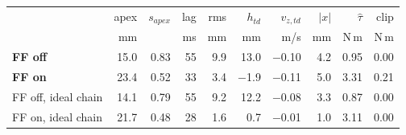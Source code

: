 \begin{tabular}{lrrrrrrrrr}
\toprule
 & apex & $s_{apex}$ & lag & rms & $h_{td}$ & $v_{z,td}$ & $|x|$ & $\hat\tau$ & clip \\
 & mm & & ms & mm & mm & m/s & mm & N\,m & N\,m \\
\midrule
\textbf{FF off} & 15.0 & 0.83 & 55 & 9.9 & 13.0 & $-$0.10 & 4.2 & 0.95 & 0.00 \\
\textbf{FF on} & 23.4 & 0.52 & 33 & 3.4 & $-$1.9 & $-$0.11 & 5.0 & 3.31 & 0.21 \\
\midrule
FF off, ideal chain & 14.1 & 0.79 & 55 & 9.2 & 12.2 & $-$0.08 & 3.3 & 0.87 & 0.00 \\
FF on, ideal chain & 21.7 & 0.48 & 28 & 1.6 & 0.7 & $-$0.01 & 1.0 & 3.11 & 0.00 \\
\bottomrule
\end{tabular}
